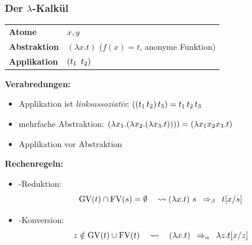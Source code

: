 \documentclass{beamer}
\DeclareMathOperator{\GV}{GV}
\DeclareMathOperator{\FV}{FV}
\begin{document}
\begin{frame}\frametitle{Der $\lambda$-Kalkül}
	\footnotesize
	\begin{tabular}{@{}ll}
		\textbf{Atome} & $x,y$ \\
		\textbf{Abstraktion} & $(\lambda x.t)$\hspace{1cm} \textcolor{cdgray}{($f(x) = t$, anonyme Funktion)} \\
		\textbf{Applikation} & $(t_1 \enskip  t_2)$
	\end{tabular}

	\medskip
	
	\textbf{Verabredungen:} \vspace{-1em}
	\begin{itemize}
		\item Applikation ist \textit{linksassoziativ}: 
		$((t_1 \, t_2) \, t_3) = t_1 \, t_2 \, t_3 \enskip$ %
		\item mehrfache Abstraktion: 
		$(\lambda x_1 . (\lambda x_2 . (\lambda x_3 . t)))) = (\lambda x_1 x_2 x_3 . t) \enskip$ %
		\item Applikation vor Abstraktion
	\end{itemize}


	\textbf{Rechenregeln:} \vspace{-1em}
	\begin{itemize}
		\item \textbeta-Reduktion: 
		\begin{equation*}
			\GV(t) \cap \FV(s) = \emptyset \quad \leadsto (\lambda x . t) \ s \enskip \Rightarrow_\beta \enskip t[x / s]
		\end{equation*}
		\item \textalpha-Konversion:
		\begin{equation*}
			z \notin \GV(t) \cup \FV(t) \quad \leadsto \quad (\lambda x . t) \enskip \Rightarrow_\alpha \enskip \lambda z . t[x / z]
		\end{equation*}
	\end{itemize}
\end{frame}
\end{document}
